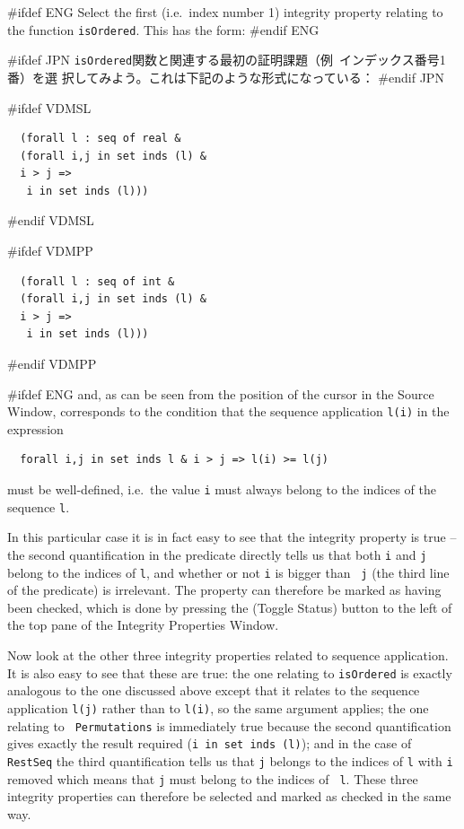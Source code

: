 \documentclass[\pformat,12pt]{article}
\newcommand{\aaa}{\tt }
\newcommand{\guicmd}[1]{{\sf #1}}
\newcommand{\guicmd}[1]{{\gt #1}}
\begin{document}
#ifdef ENG
Select the first (i.e.\ index number 1) integrity property relating to
the function {\aaa isOrdered}. This has the form:
#endif ENG

#ifdef JPN
{\aaa isOrdered}関数と関連する最初の証明課題（例\ インデックス番号1番）を選
択してみよう。これは下記のような形式になっている：
#endif JPN

#ifdef VDMSL
\begin{verbatim}
  (forall l : seq of real &
  (forall i,j in set inds (l) &
  i > j =>
   i in set inds (l)))
\end{verbatim}
#endif VDMSL

#ifdef VDMPP
\begin{verbatim}
  (forall l : seq of int &
  (forall i,j in set inds (l) &
  i > j =>
   i in set inds (l)))
\end{verbatim}
#endif VDMPP

#ifdef ENG
and, as can be seen from the position of the cursor in the
\guicmd{Source Window}, corresponds to the condition that the sequence
application \verb+l(i)+ in the expression

\begin{verbatim}
  forall i,j in set inds l & i > j => l(i) >= l(j)
\end{verbatim}

must be well-defined, i.e.\ the value {\aaa i} must always belong to the
indices of the sequence {\aaa l}.

In this particular case it is in fact easy to see that the integrity
property is true -- the second quantification in the predicate
directly tells us that both {\aaa i} and {\aaa j} belong to the
indices of {\aaa l}, and whether or not {\aaa i} is bigger than {\aaa
  j} (the third line of the predicate) is irrelevant. The property can
therefore be marked as having been checked, which is done by pressing
the
(\guicmd{Toggle Status}) button to the left of the top pane of the
\guicmd{Integrity Properties Window}.

Now look at the other three integrity properties related to sequence
application. It is also easy to see that these are true: the one
relating to {\aaa isOrdered} is exactly analogous to the one discussed
above except that it relates
to the sequence application \verb+l(j)+ rather than to \verb+l(i)+, so
the same argument applies; the one relating to {\aaa
  Permutations} is immediately true because the second quantification
gives exactly the result required (\verb+i in set inds (l)+); and in
the case of {\aaa RestSeq} the third quantification tells us that
{\aaa j} belongs to the indices of {\aaa l} with {\aaa i} removed
which means that {\aaa j} must belong to the indices of {\aaa
  l}. These three integrity properties can therefore be selected and
marked as checked in the same way.
\end{document}
